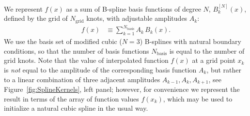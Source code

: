 \documentclass[12pt]{article}
\begin{document}
We represent $f(x)$ as a sum of B-spline basis functions of degree $N$, $B^{[N]}_k(x)$, defined by the grid of $N_\mathrm{grid}$ knots, with adjustable amplitudes $A_k$:
\begin{align}  \label{eq:FncSplineFit}
f(x) &\equiv \sum_{k=1}^{N_\mathrm{basis}} A_k\,B_k(x).
\end{align}
We use the basis set of modified cubic ($N=3$) B-splines with natural boundary conditions, so that the number of basis functions $N_\mathrm{basis}$ is equal to the number of grid knots. Note that the value of interpolated function $f(x)$ at a grid point $x_k$ is \textit{not} equal to the amplitude of the corresponding basis function $A_k$, but rather to a linear combination of three adjacent amplitudes $A_{k-1},A_k,A_{k+1}$, see Figure~\ref{fig:SplineKernels}, left panel; however, for convenience we represent the result in terms of the array of function values $f(x_k)$, which may be used to initialize a natural cubic spline in the usual way.
\end{document}
